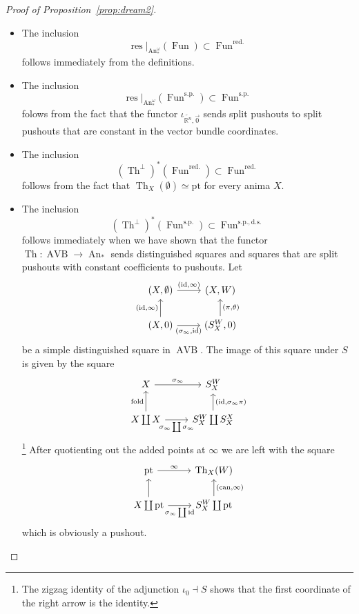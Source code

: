 \documentclass{article}
\newcommand{\R}{\mathbb{R}} %
\newcommand{\pt}{\mathrm{pt}}
\newcommand{\id}{\mathrm{id}}
\newcommand{\iotarnzero}{\iota_{\overleftarrow{\R^n},\overrightarrow{0}}}
\DeclareMathOperator{\AVB}{AVB}
\DeclareMathOperator{\An}{An}
\DeclareMathOperator{\Fun}{Fun}
\DeclareMathOperator{\res}{res}
\DeclareMathOperator{\Th}{Th}
\begin{document}
\begin{proof}[Proof of Proposition~\ref{prop:dream2}]
    \begin{itemize}
        \item The inclusion 
        \[
            \res|_{\An_*^\omega}(\Fun) \subset \Fun^\mathrm{red.}
        \]
        follows immediately from the definitions.
        \item The inclusion 
        \[
            \res|_{\An_*^\omega}(\Fun^\mathrm{s.p.}) \subset \Fun^{\mathrm{s.p.}}
        \]
        folows from the fact that the functor $\iotarnzero$ sends split pushouts to split pushouts that are constant in the vector bundle 
        coordinates.
        \item The inclusion 
        \[
            (\Th^\perp)^*(\Fun^\mathrm{red.}) \subset \Fun^\mathrm{red.}
        \]
        follows from the fact that $\Th_X(\emptyset) \simeq \pt$ for every anima $X$.
        \item The inclusion 
        \[
            (\Th^\perp)^*(\Fun^\mathrm{s.p.}) \subset \Fun^\mathrm{s.p., d.s.}
        \]
        follows immediately when we have shown that the functor $\Th \colon \AVB \to \An_*$ sends distinguished squares and squares that are split pushouts 
        with constant coefficients to pushouts. 
        Let 
        \[\begin{tikzcd}
            {(X,\emptyset)} & {(X,W)} \\
            {(X,0)} & {(S^W_X,0)}
            \arrow["{(\id,\infty)}", from=2-1, to=1-1]
            \arrow["{(\id,\infty)}", from=1-1, to=1-2]
            \arrow["{(\sigma_\infty,\id)}"', from=2-1, to=2-2]
            \arrow["{(\pi,\theta)}"', from=2-2, to=1-2]
        \end{tikzcd}\]
        be a simple distinguished square in $\AVB$.
        The image of this square under $S$ is given by the square 
        \[\begin{tikzcd}
            X & {S^W_X} \\
            {X \coprod X} & {S^W_X \coprod S^X_X}
            \arrow["{\mathrm{fold}}", from=2-1, to=1-1]
            \arrow["{\sigma_\infty}", from=1-1, to=1-2]
            \arrow["{\sigma_\infty \coprod \sigma_\infty}"', from=2-1, to=2-2]
            \arrow["{(\id, \sigma_\infty \pi)}"', from=2-2, to=1-2]
        \end{tikzcd}\]\footnote{The zigzag identity of the adjunction $\iota_0 \dashv S$ shows that the first coordinate of the right arrow is the identity.}
        After quotienting out the added points at $\infty$ we are left with the square 
        \[\begin{tikzcd}
            \pt & {\Th_X(W)} \\
            {X \coprod \pt} & {S^W_X \coprod \pt}
            \arrow[from=2-1, to=1-1]
            \arrow["\infty", from=1-1, to=1-2]
            \arrow["{\sigma_\infty \coprod \id}"', from=2-1, to=2-2]
            \arrow["{(\mathrm{can},\infty)}"', from=2-2, to=1-2]
        \end{tikzcd}\]
        which is obviously a pushout.


\end{itemize}
\end{proof}
\end{document}
